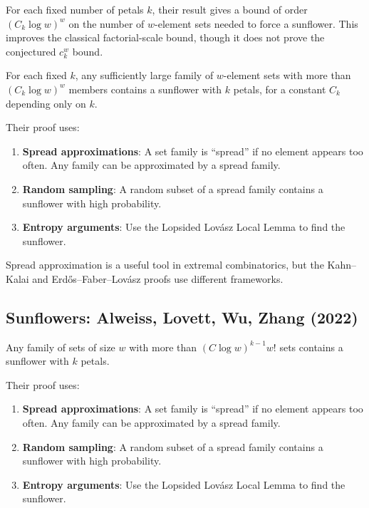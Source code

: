 For each fixed number of petals $k$, their result gives a bound of order $(C_k\log w)^w$ on the number of $w$-element sets needed to force a sunflower. This improves the classical factorial-scale bound, though it does not prove the conjectured $c_k^w$ bound.

\begin{theorem}
For each fixed $k$, any sufficiently large family of $w$-element sets with more than $(C_k\log w)^w$ members contains a sunflower with $k$ petals, for a constant $C_k$ depending only on $k$.
\end{theorem}

Their proof uses:
\begin{enumerate}
\item \textbf{Spread approximations}: A set family is ``spread'' if no element appears too often. Any family can be approximated by a spread family.
\item \textbf{Random sampling}: A random subset of a spread family contains a sunflower with high probability.
\item \textbf{Entropy arguments}: Use the Lopsided Lov\'{a}sz Local Lemma to find the sunflower.
\end{enumerate}

\begin{highlightbox}
Spread approximation is a useful tool in extremal combinatorics, but the Kahn--Kalai and Erd\H{o}s--Faber--Lov\'{a}sz proofs use different frameworks.
\end{highlightbox}

\subsection{Sunflowers: Alweiss, Lovett, Wu, Zhang (2022)}

\begin{theorem}
Any family of sets of size $w$ with more than $(C \log w)^{k-1} w!$ sets contains a sunflower with $k$ petals.
\end{theorem}

Their proof uses:
\begin{enumerate}
\item \textbf{Spread approximations}: A set family is ``spread'' if no element appears too often. Any family can be approximated by a spread family.
\item \textbf{Random sampling}: A random subset of a spread family contains a sunflower with high probability.
\item \textbf{Entropy arguments}: Use the Lopsided Lov\'{a}sz Local Lemma to find the sunflower.
\end{enumerate}

